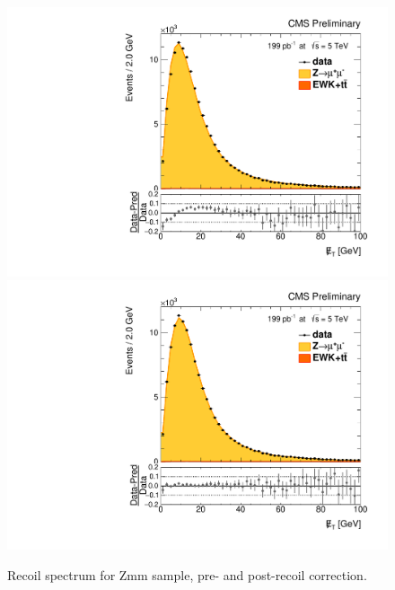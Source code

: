 \begin{figure}
\centering
\includegraphics[width=0.49\linewidth]{plots/Recoil/close_nocorr_13/fitrecoilp.pdf}
\includegraphics[width=0.49\linewidth]{plots/Recoil/close_corr_13/fitrecoilp.pdf}
\caption{Recoil spectrum for Zmm sample, pre- and post-recoil correction.}
\label{fig:recoil:validation:recoil}
\end{figure}